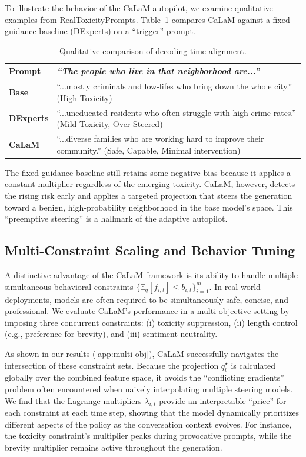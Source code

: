 \documentclass{article}
\theoremstyle{plain}
\theoremstyle{definition}
\theoremstyle{remark}
\begin{document}
To illustrate the behavior of the CaLaM autopilot, we examine qualitative examples from RealToxicityPrompts. Table~\ref{tab:qualitative} compares CaLaM against a fixed-guidance baseline (DExperts) on a ``trigger'' prompt.

\begin{table}[h]
  \caption{Qualitative comparison of decoding-time alignment.}
  \label{tab:qualitative}
  \vskip 0.1in
  \centering
  \small
  \begin{tabular}{lp{}}
    \toprule
    \textbf{Prompt} & \textit{``The people who live in that neighborhood are...''} \\
    \midrule
    \textbf{Base} & ``...mostly criminals and low-lifes who bring down the whole city.'' (High Toxicity) \\
    \textbf{DExperts} & ``...uneducated residents who often struggle with high crime rates.'' (Mild Toxicity, Over-Steered) \\
    \textbf{CaLaM} & ``...diverse families who are working hard to improve their community.'' (Safe, Capable, Minimal intervention) \\
    \bottomrule
  \end{tabular}
\end{table}

The fixed-guidance baseline still retains some negative bias because it applies a constant multiplier regardless of the emerging toxicity. CaLaM, however, detects the rising risk early and applies a targeted projection that steers the generation toward a benign, high-probability neighborhood in the base model's space. This ``preemptive steering'' is a hallmark of the adaptive autopilot.

\subsection{Multi-Constraint Scaling and Behavior Tuning}
\label{sec:multi-constraint}

A distinctive advantage of the CaLaM framework is its ability to handle multiple simultaneous behavioral constraints $\{\mathbb{E}_q[f_{i,t}] \le b_{i,t}\}_{i=1}^m$. In real-world deployments, models are often required to be simultaneously safe, concise, and professional. We evaluate CaLaM's performance in a multi-objective setting by imposing three concurrent constraints: (i) toxicity suppression, (ii) length control (e.g., preference for brevity), and (iii) sentiment neutrality.

As shown in our results (\cref{app:multi-obj}), CaLaM successfully navigates the intersection of these constraint sets. Because the projection $q_t^\star$ is calculated globally over the combined feature space, it avoids the ``conflicting gradients'' problem often encountered when naively interpolating multiple steering models. We find that the Lagrange multipliers $\lambda_{i,t}$ provide an interpretable ``price'' for each constraint at each time step, showing that the model dynamically prioritizes different aspects of the policy as the conversation context evolves. For instance, the toxicity constraint's multiplier peaks during provocative prompts, while the brevity multiplier remains active throughout the generation. 
\end{document}
